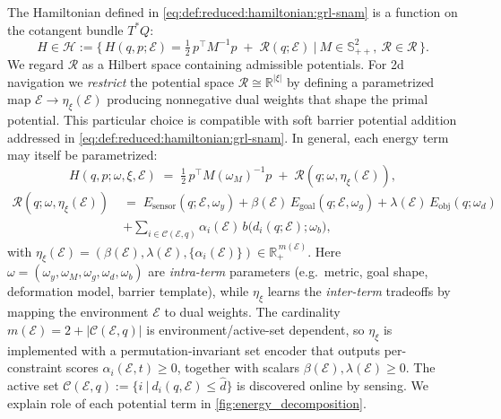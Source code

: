 \documentclass{article} %
\begin{document}
    The Hamiltonian defined in \cref{eq:def:reduced:hamiltonian:grl-snam} is a function on the cotangent bundle $T^{*}Q$:
\[
H \in \mathscr{H}:=\big\{\,H(q,p;\mathcal{E})=\tfrac12\,p^\top M^{-1}p\;+\;\mathcal{R}(q;\mathcal{E}) 
\ \big|\ M\in \mathbb{S}_{++}^2,\ \mathcal{R}\in \mathscr{R} \,\big\}.
\]
We regard $\mathscr{R}$ as a Hilbert space containing admissible potentials. For 2d navigation we \emph{restrict} the potential space $\mathscr{R}\cong \mathbb{R}^{\vert \xi\vert}$ by defining a parametrized map $\mathcal E\!\to\!\eta_{\xi}(\mathcal E)$ producing
nonnegative dual weights that shape the primal potential. This particular choice is compatible with soft barrier potential addition addressed in \cref{eq:def:reduced:hamiltonian:grl-snam}. In general, each energy
term may itself be parametrized:
\[
H(q,p;\omega,\xi,\mathcal E)\;=\;\tfrac12\,p^\top M(\omega_M)^{-1}p
\;+\;\mathcal{R}(q;\omega,\eta_{\xi}(\mathcal E)),
\]
\vspace{-0.75ex}
\begin{equation}
\begin{aligned}
\mathcal{R}(q;\omega, \eta_{\xi}(\mathcal E))\;&=\;
E_{\mathrm{sensor}}(q;\mathcal{E},\omega_y)+ 
\beta(\mathcal E)\,E_{\mathrm{goal}}(q;\mathcal E,\omega_g)
+\lambda(\mathcal E)\,E_{\mathrm{obj}}(q;\omega_d)
\\
&+\sum_{i\in\mathcal C(\mathcal E,q)} \alpha_i(\mathcal E)\,
b\big(d_i(q;\mathcal E);\omega_b\big),
\end{aligned}
\end{equation}
with $\eta_{\xi}(\mathcal E)\!=\!(\beta(\mathcal E),\lambda(\mathcal E),\{\alpha_i(\mathcal E)\})\in\mathbb R_+^{\,m(\mathcal E)}$.
Here $\omega\!=\!(\omega_y,\omega_M,\omega_g,\omega_d,\omega_b)$ are \emph{intra-term} parameters
(e.g.\ metric, goal shape, deformation model, barrier template), while $\eta_\xi$
learns the \emph{inter-term} tradeoffs by mapping the environment $\mathcal E$
to dual weights. The cardinality $m(\mathcal E)=2+|\mathcal C(\mathcal E,q)|$ is
environment/active-set dependent, so $\eta_\xi$ is implemented with a permutation-invariant
set encoder that outputs per-constraint scores
$\alpha_i(\mathcal E,t)\!\ge\!0$, together
with scalars $\beta(\mathcal E),\lambda(\mathcal E)\!\ge\!0$. The active set $\mathcal{C}(\mathcal{E},q):=\{i~|~d_i(q,\mathcal{E})\leq \hat{d}\}$ is discovered online by sensing. We explain role of each potential term in \cref{fig:energy_decomposition}.


\end{document}
